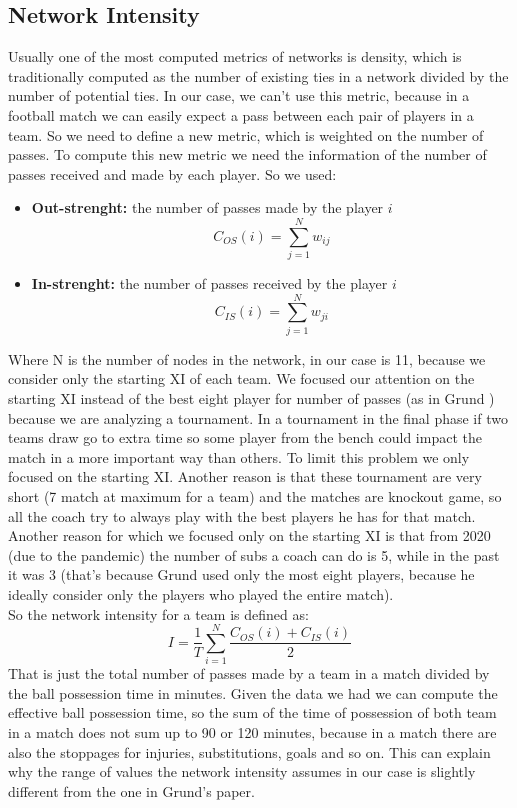 \documentclass[12pt, a4paper]{article}
\begin{document}
\subsection{Network Intensity}
Usually one of the most computed metrics of networks is density, which
is traditionally computed as the number of existing ties in a network divided by the number of potential ties. In our case, we can't use this metric, because in a football match we can easily expect a pass between each pair of players in a team. So we need to define a new metric, which is weighted on the number of passes. To compute this new metric we need the information of the number of passes received and made by each player. So we used: 
\begin{itemize}
        \item \textbf{Out-strenght:} the number of passes made by the player $i$
        $$ C_{OS}(i) = \sum^{N}_{j=1}w_{ij}$$
        \item \textbf{In-strenght:} the number of passes received by the player $i$
         $$C_{IS}(i) = \sum^{N}_{j=1}w_{ji}$$
\end{itemize}
Where N is the number of nodes in the network, in our case is 11, because we consider only the starting XI of each team. We focused our attention on the starting XI instead of the best eight player for number of passes (as in Grund \cite{GRUND}) because we are analyzing a tournament. In a tournament in the final phase if two teams draw go to extra time so some player from the bench could impact the match in a more important way than others. To limit this problem we only focused on the starting XI. Another reason is that these tournament are very short (7 match at maximum for a team) and the matches are knockout game, so all the coach try to always play with the best players he has for that match. Another reason for which we focused only on the starting XI is that from 2020 (due to the pandemic) the number of subs a coach can do is 5, while in the past it was 3 (that's because Grund used only the most eight players, because he ideally consider only the players who played the entire match). \\
So the network intensity for a team is defined as:
$$I = \frac{1}{T}\sum^N_{i=1} \frac{ C_{OS}(i) +  C_{IS}(i)}{2}$$
That is just the total number of passes made by a team in a match divided by the ball possession time in minutes. Given the data we had we can compute the effective ball possession time, so the sum of the time of possession of both team in a match does not sum up to 90 or 120 minutes, because in a match there are also the stoppages for injuries, substitutions, goals and so on. This can explain why the range of values the network intensity assumes in our case is slightly different from the one in Grund's paper.
\\
\end{document}

